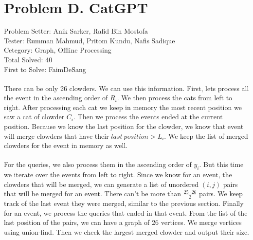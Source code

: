 \section*{Problem D. CatGPT}
Problem Setter: Anik Sarker,  Rafid Bin Mostofa\\
Tester: Rumman Mahmud, Pritom Kundu, Nafis Sadique \\
Cetegory: Graph, Offline Processing \\
Total Solved: 40 \\
First to Solve: FaimDeSang \\
\\
There can be only 26 clowders. We can use this information. First, lets process
all the event in the ascending order of $R_i$. We then process the cats from left
to right. After processing each cat we keep in memory the most recent position we 
saw a cat of clowder $C_i$. Then we process the events ended at the current position.
Because we know the last position for the clowder, we know that event will merge
clowders that have their $last\ position > L_i$. We keep the list of merged clowders
for the event in memory as well.\\
\\
For the queries, we also process them in the ascending order of $y_i$. But this time we 
iterate over the events from left to right. Since we know for an event, the clowders that
will be merged, we can generate a list of unordered $(i,j)$ pairs that will be merged for
an event. There can't be more than $\frac{25 \cdot 26}{2}$ pairs. We keep track of the last event
they were merged, similar to the previous section. Finally for an event, we process the 
queries that ended in that event. From the list of the last position of the pairs, we
can have a graph of 26 vertices. We merge vertices using union-find. Then we check the largest
merged clowder and output their size.
